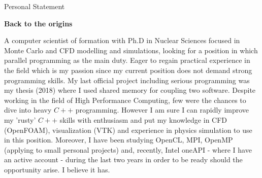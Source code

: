 \documentclass[11pt]{letter}
\begin{document}
\begin{letter}{Personal Statement}

\begin{center}
  \textbf{Back to the origins}
\end{center}

  \bigskip\noindent
  
A computer scientist of formation with Ph.D in Nuclear Sciences focused in Monte Carlo and CFD modelling and simulations, looking for a position in which parallel programming as the main duty. Eager to regain practical experience in the field which is my passion since my current position does not demand strong programming skills. My last official project including serious programming was my thesis (2018) where I used shared memory for coupling two software. Despite working in the field of High Performance Computing, few were the chances to dive into heavy $C++$ programming. However I am sure I can rapidly improve my 'rusty' $C++$ skills with enthusiasm and put my knowledge in CFD (OpenFOAM), visualization (VTK) and experience in physics simulation to use in this position. Moreover, I have been studying OpenCL, MPI, OpenMP (applying to small personal projects) and, recently, Intel oneAPI - where I have an active account - during the last two years in order to be ready should the opportunity arise. I believe it has.     
  
\end{letter}
\end{document}

